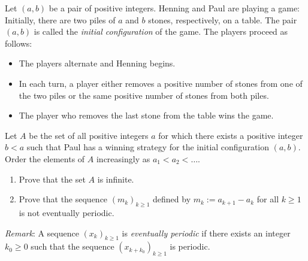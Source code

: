 Let $(a,b)$ be a pair of positive integers.
Henning and Paul are playing a game:
Initially, there are two piles of $a$ and $b$ stones, respectively, on a table.
The pair $(a,b)$ is called the \emph{initial configuration} of the game.
The players proceed as follows:
\begin{itemize}
    \item The players alternate and Henning begins.
    \item In each turn, a player either removes a positive number of stones
    from one of the two piles or the same positive number of stones from both piles.
    \item The player who removes the last stone from the table wins the game.
\end{itemize}
Let $A$ be the set of all positive integers $a$ for which there exists
a positive integer $b<a$ such that Paul has a winning strategy for the initial configuration $(a,b)$.
Order the elements of $A$ increasingly as $a_1<a_2<\ldots$.
\begin{enumerate}
    \item[a)] Prove that the set $A$ is infinite.
    \item[b)] Prove that the sequence $(m_k)_{k \geq 1}$ defined by $m_k := a_{k+1} - a_k$
    for all $k\geq 1$ is not eventually periodic.
\end{enumerate}

\emph{Remark}: A sequence $(x_k)_{k \geq 1}$ is \emph{eventually periodic} if
there exists an integer $k_0\geq 0$ such that the sequence $(x_{k+k_0})_{k\geq 1}$ is periodic.
